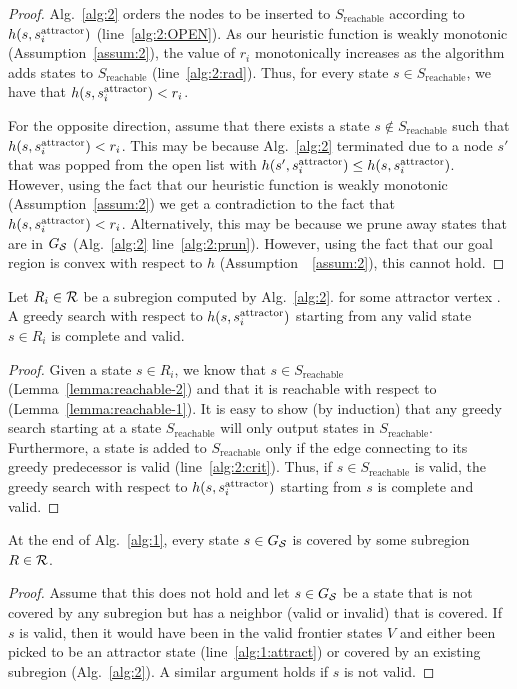 \documentclass[a4paper,10pt]{article}
\begin{document}
\begin{proof}
Alg.~\ref{alg:2} orders the nodes to be inserted to $S_{\text{reachable}}$ according to $h(s, s^{\text{attractor}}_i)$ (line~\ref{alg:2:OPEN}).
As our heuristic function is weakly monotonic (Assumption~\ref{assum:2}), the value of $r_i$ monotonically increases as the algorithm adds states to $S_{\text{reachable}}$ (line~\ref{alg:2:rad}).
Thus, for every state $s \in S_{\text{reachable}}$, we have that $h(s, s^{\text{attractor}}_i) < r_i$.

For the opposite direction, assume that there exists a state $s \notin S_{\text{reachable}}$ such that $h(s, s^{\text{attractor}}_i) < r_i$.
This may be because  Alg.~\ref{alg:2} terminated due to a node $s'$ that was popped from the open list with 
$h(s', s^{\text{attractor}}_i) \leq h(s, s^{\text{attractor}}_i)$.
However, using the fact that our heuristic function is weakly monotonic (Assumption~\ref{assum:2}) we get a contradiction to the fact that $h(s, s^{\text{attractor}}_i) < r_i$.
Alternatively, this may be because we prune away states that are in $G_\mathcal{S}$  (Alg.~\ref{alg:2} line~\ref{alg:2:prun}).
However, using the fact that our goal region is convex with respect to $h$ (Assumption~~\ref{assum:2}), this cannot hold.
\end{proof}

\begin{lemma}
\label{lemma:greedy}
Let $R_i \in \mathcal{R}$ be a subregion computed by Alg.~\ref{alg:2}.
for some attractor vertex \sAttract.
% 
A greedy search with respect to $h(s, s^{\text{attractor}}_i)$  starting from any valid state $s \in R_i$ is complete and valid.
\end{lemma}

\begin{proof}
Given a state $s \in R_i$, we know that $s \in S_{\text{reachable}}$ (Lemma~\ref{lemma:reachable-2})
and that it is reachable with respect to \sAttract (Lemma~\ref{lemma:reachable-1}).
%
It is easy to show (by induction) that any greedy search starting at a state $S_{\text{reachable}}$ will only output states in $S_{\text{reachable}}$.
Furthermore, a state is added to $S_{\text{reachable}}$ only if the edge connecting to its greedy predecessor is valid (line~\ref{alg:2:crit}).
Thus, if $s\in S_{\text{reachable}}$ is valid, the greedy search with respect to $h(s, s^{\text{attractor}}_i)$  starting from $s$ is complete and valid.
\end{proof}

\begin{lemma}
\label{lemma:coverage}
At the end of Alg.~\ref{alg:1}, every state $s \in G_\mathcal{S}$ is covered by some subregion $R \in \mathcal{R}$.
\end{lemma}
\begin{proof}
Assume that this does not hold and let $s \in G_\mathcal{S}$ be a state that is not covered by any subregion but has a neighbor (valid or invalid) that is covered.
%
If $s$ is valid, then it would have been in the valid frontier states $V$ and either been picked to be an attractor state (line~\ref{alg:1:attract}) or covered by an existing subregion (Alg.~\ref{alg:2}).
%
A similar argument holds if $s$ is not valid.
\end{proof}
\end{document}

